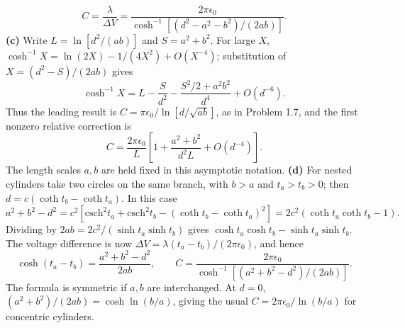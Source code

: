 \[
\boxed{C=\frac{\lambda}{\Delta V}
 =\frac{2\pi\epsilon _0}
 {\cosh^{-1}[(d^2-a^2-b^2)/(2ab)]}.}
\]
\textbf{(c)} Write $L=\ln[d^2/(ab)]$ and $S=a^2+b^2$.
For large $X$, $\cosh^{-1}X=\ln(2X)-1/(4X^2)+O(X^{-4})$;
substitution of $X=(d^2-S)/(2ab)$ gives
\[
\cosh^{-1}X=L-\frac{S}{d^2}
 -\frac{S^2/2+a^2b^2}{d^4}+O(d^{-6}).
\]
Thus the leading result is
$C=\pi\epsilon _0/\ln[d/\sqrt{ab}]$, as in Problem 1.7, and the first
nonzero relative correction is
\[
\boxed{C=\frac{2\pi\epsilon _0}{L}
 \left[1+\frac{a^2+b^2}{d^2L}+O(d^{-4})\right].}
\]
The length scales $a,b$ are held fixed in this asymptotic notation.
\textbf{(d)} For nested cylinders take two circles on the same
branch, with $b>a$ and $t_a>t_b>0$; then
$d=c(\coth t_b-\coth t_a)$. In this case
\[
a^2+b^2-d^2
=c^2[\mathrm{csch}^2t_a+\mathrm{csch}^2t_b
-(\coth t_b-\coth t_a)^2]
=2c^2(\coth t_a\coth t_b-1).
\]
Dividing by $2ab=2c^2/(\sinh t_a\sinh t_b)$ gives
$\cosh t_a\cosh t_b-\sinh t_a\sinh t_b$.
The voltage difference is now
$\Delta V=\lambda(t_a-t_b)/(2\pi\epsilon_0)$, and hence
\[
\cosh(t_a-t_b)=\frac{a^2+b^2-d^2}{2ab},\qquad
\boxed{C=\frac{2\pi\epsilon _0}
 {\cosh^{-1}[(a^2+b^2-d^2)/(2ab)]}}.
\]
The formula is symmetric if $a,b$ are interchanged. At $d=0$,
$(a^2+b^2)/(2ab)=\cosh\ln(b/a)$, giving the usual
$C=2\pi\epsilon _0/\ln(b/a)$ for concentric cylinders.

